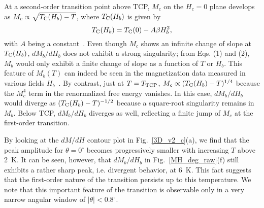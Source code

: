 \documentclass[twocolumn, aps, superscriptaddress, amsfonts,floatfix]{revtex4}%
\begin{document}
{At a second-order transition point above TCP, $M_c$ on the $H_c=0$ plane develops as  $M_c\propto \sqrt{T_{\rm C}(H_b)-T}$, where $T_{\rm C}(H_b)$ is given by
\begin{equation}
T_{\rm C}(H_b)=T_{\rm C}(0)-A\beta H_b^2,
\end{equation}
with $A$ being a constant~\cite{PhysRevB.91.014506}. Even though $M_c$ shows an infinite change of slope at  $T_{\rm C}(H_b)$, $dM_b/dH_b$ does not exhibit a strong singularity; 
from Eqs. (1) and (2), $M_b$ would only exhibit a finite change of slope as a function of $T$ or $H_b$. 
This feature of $M_b(T)$ can indeed be seen in the magnetization data measured in various fields $H_b$~\cite{hardy2011transverse}.
By contrast, just at $T=T_{\rm TCP}$, $M_c \propto  (T_{\rm C}(H_b)-T)^{1/4}$ because the $M_c^4$ term in the renormalized free energy vanishes. In this case, $dM_b/dH_b$ would diverge as $(T_{\rm C}(H_b)-T)^{-1/2}$ because a square-root singularity remains in $M_b$.
Below TCP, $dM_b/dH_b$ diverges as well, reflecting a finite jump of $M_c$ at the first-order transition. 


By looking at the $dM/dH$ contour plot in Fig.~\ref{3D_v2_c}(a), we find that
the peak amplitude for $\theta=0$$^\circ$ becomes progressively smaller with increasing $T$ above 2~K.  It can be seen, however, that $dM_b/dH_b$ in Fig.~\ref{MH_deg_raw}(f) still exhibits a rather sharp peak, i.e. divergent behavior, at 6~K. This fact suggests that the first-order nature of the transition persists up to this temperature.
We note that this important feature of the transition is observable only in a very narrow angular window of $|\theta|<0.8^\circ$.



}
\end{document}
